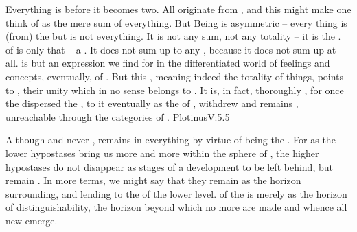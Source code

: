 \label{sub:pantheism}
\pa
Everything is  before it becomes two.  All  originate
from , and this might make one think of  as the mere sum of
everything. But Being is asymmetric -- every thing is (from) the  but
 is not everything. %
It is not any sum, not any  totality -- it is the .   of  is only that -- a . It does
not sum up to any , because it does not sum up at all.   is
but an expression we find for  in the differentiated world of
feelings and concepts, eventually, of .  But this
, meaning indeed the totality of things, points to
, their unity which in no sense belongs to . It
is, in fact, thoroughly , for once the 
  dispersed the , to 
  it eventually as the  of ,
withdrew and remains  , unreachable through the categories of
. \citet{The First remains intact even when other entities spring from
  it.}{Plotinus}{V:5.5}

\pa Although  and never ,  remains
 in everything by virtue of being the .
For as the lower hypostases bring us more and more within the sphere of
, the higher hypostases do not disappear as stages of a
development to be left behind, but remain .  In more 
terms, we might say that they  remain  as the horizon surrounding,
and lending  to the  of the lower level.  of
the  is merely as the horizon of distinguishability, the horizon beyond
which no more  are made and whence all new  emerge.

